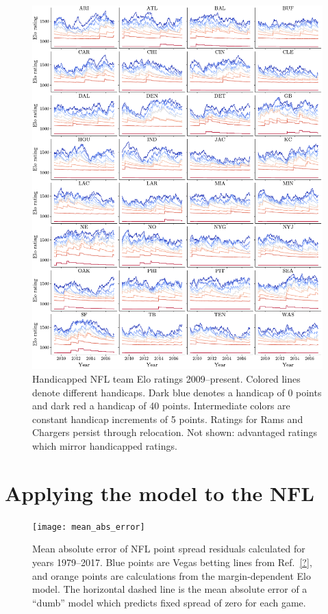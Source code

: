 \documentclass[aps,prc,reprint,amsmath,superscriptaddress]{revtex4-1}
\begin{document}
\begin{figure}
  \includegraphics{team_history}
  \caption{Handicapped NFL team Elo ratings 2009--present. Colored lines denote different handicaps. Dark blue denotes a handicap of 0 points and dark red a handicap of 40 points. Intermediate colors are constant handicap increments of 5 points. Ratings for Rams and Chargers persist through relocation. Not shown: advantaged ratings which mirror handicapped ratings.}
\end{figure}


\section{Applying the model to the NFL}

\begin{figure}
  \texttt{[image: mean\_abs\_error]}
  \caption{Mean absolute error of NFL point spread residuals calculated for years 1979--2017. Blue points are Vegas betting lines from Ref.~\ref{?}, and orange points are calculations from the margin-dependent Elo model. The horizontal dashed line is the mean absolute error of a ``dumb'' model which predicts fixed spread of zero for each game.}
  \label{fig:mean_abs_error}
\end{figure}
\end{document}
